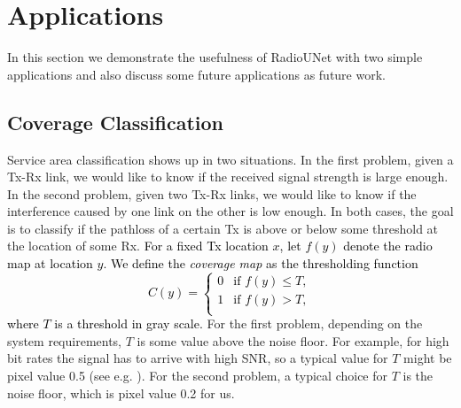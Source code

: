 \documentclass[10pt,a4paper]{article}
\begin{document}
\section{Applications}

In this section we demonstrate the usefulness of RadioUNet with two simple applications and also discuss some future applications as future work.

\subsection{Coverage Classification}
\label{Service area classification}

Service area classification shows up in two situations. In the first problem, given a Tx-Rx link, we would like to know if the received signal strength is large enough. 
In the second problem, given two Tx-Rx links, we would like to know if the interference caused by one link on the other is low enough. In both cases, the goal is to classify if the pathloss of a certain Tx is above or below some threshold at the location of some Rx.  
\textcolor{black}{
For a fixed Tx location $x$, let $f(y)$ denote the radio map at location $y$. 
We define the \emph{coverage map} as the thresholding function 
\begin{equation} 
C(y) =
\begin{cases}
0 &  \text{if } f(y) \leq T, \\
1   & \text{if } f(y) > T, \\
\end{cases} 
\end{equation}
where $T$ is a threshold in gray scale.}  
For the first problem, depending on the system requirements, $T$ is some value above the noise floor. 
For example, for high bit rates the signal has to arrive with high SNR, so a typical value for $T$ might be pixel value 0.5 (see e.g. \cite{etsi_302663}). For the second problem, a typical choice for $T$ is the noise floor, which is pixel value 0.2 for us. 
\end{document}
